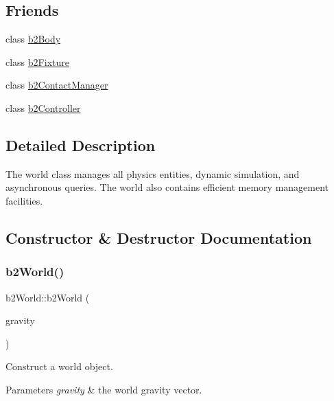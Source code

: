 \subsection*{Friends}
\begin{DoxyCompactItemize}
\item 
class \mbox{\hyperlink{classb2_world_a010ab52de250e5fe30a45d642f46405b}{b2\+Body}}
\item 
class \mbox{\hyperlink{classb2_world_afb35b0e61f6ee3cc516c40ea251f3236}{b2\+Fixture}}
\item 
class \mbox{\hyperlink{classb2_world_aece264d42f69aed410f5eb3beba6ddf2}{b2\+Contact\+Manager}}
\item 
class \mbox{\hyperlink{classb2_world_ad0171f9dac44cc7aae065c618c0d165b}{b2\+Controller}}
\end{DoxyCompactItemize}


\subsection{Detailed Description}
The world class manages all physics entities, dynamic simulation, and asynchronous queries. The world also contains efficient memory management facilities. 

\subsection{Constructor \& Destructor Documentation}
\mbox{\label{classb2_world_aeccc87fd9e36702c821a8244ca7cd875}} 
\subsubsection{\texorpdfstring{b2World()}{b2World()}}
{\footnotesize\ttfamily b2\+World\+::b2\+World (\begin{DoxyParamCaption}\item[{const \mbox{\hyperlink{structb2_vec2}{b2\+Vec2}} \&}]{gravity }\end{DoxyParamCaption})}

Construct a world object. 
\begin{DoxyParams}{Parameters}
{\em gravity} & the world gravity vector. \\
\hline
\end{DoxyParams}
\mbox{\label{classb2_world_a5250ae4487475c33ccefdead07c768c8}} 
